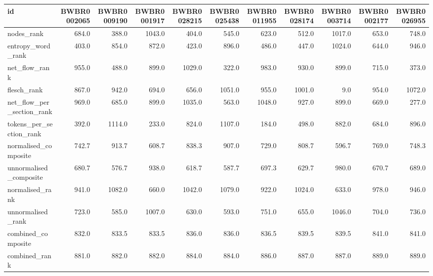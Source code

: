 \begin{tabular}{lrrrrrrrrrr}
\toprule
id & BWBR0002065 & BWBR0009190 & BWBR0001917 & BWBR0028215 & BWBR0025438 & BWBR0011955 & BWBR0028174 & BWBR0003714 & BWBR0002177 & BWBR0026955 \\
\midrule
nodes\_rank & 684.0 & 388.0 & 1043.0 & 404.0 & 545.0 & 623.0 & 512.0 & 1017.0 & 653.0 & 748.0 \\
\cline{1-11}
entropy\_word\_rank & 403.0 & 854.0 & 872.0 & 423.0 & 896.0 & 486.0 & 447.0 & 1024.0 & 644.0 & 946.0 \\
\cline{1-11}
net\_flow\_rank & 955.0 & 488.0 & 899.0 & 1029.0 & 322.0 & 983.0 & 930.0 & 899.0 & 715.0 & 373.0 \\
\cline{1-11}
flesch\_rank & 867.0 & 942.0 & 694.0 & 656.0 & 1051.0 & 955.0 & 1001.0 & 9.0 & 954.0 & 1072.0 \\
\cline{1-11}
net\_flow\_per\_section\_rank & 969.0 & 685.0 & 899.0 & 1035.0 & 563.0 & 1048.0 & 927.0 & 899.0 & 669.0 & 277.0 \\
\cline{1-11}
tokens\_per\_section\_rank & 392.0 & 1114.0 & 233.0 & 824.0 & 1107.0 & 184.0 & 498.0 & 882.0 & 684.0 & 896.0 \\
\cline{1-11}
normalised\_composite & 742.7 & 913.7 & 608.7 & 838.3 & 907.0 & 729.0 & 808.7 & 596.7 & 769.0 & 748.3 \\
\cline{1-11}
unnormalised\_composite & 680.7 & 576.7 & 938.0 & 618.7 & 587.7 & 697.3 & 629.7 & 980.0 & 670.7 & 689.0 \\
\cline{1-11}
normalised\_rank & 941.0 & 1082.0 & 660.0 & 1042.0 & 1079.0 & 922.0 & 1024.0 & 633.0 & 978.0 & 946.0 \\
\cline{1-11}
unnormalised\_rank & 723.0 & 585.0 & 1007.0 & 630.0 & 593.0 & 751.0 & 655.0 & 1046.0 & 704.0 & 736.0 \\
\cline{1-11}
combined\_composite & 832.0 & 833.5 & 833.5 & 836.0 & 836.0 & 836.5 & 839.5 & 839.5 & 841.0 & 841.0 \\
\cline{1-11}
combined\_rank & 881.0 & 882.0 & 882.0 & 884.0 & 884.0 & 886.0 & 887.0 & 887.0 & 889.0 & 889.0 \\
\cline{1-11}
\bottomrule
\end{tabular}
